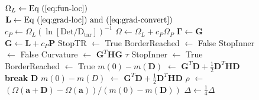 \documentclass[aps,prl,reprint,amsmath,amssymb]{revtex4-1}
\begin{document}
\begin{figure}
\begin{algorithm}[H]
\begin{algorithmic}[1]
			\State $\Omega_{L} \gets \text{Eq~(\ref{eq:fun-loc})}$ 
			\State $\mathbf{L} \gets \text{Eq~(\ref{eq:grad-loc}) and~(\ref{eq:grad-convert})}$ 
				\State $c_{P} \gets \Omega_{L}(\ln [\text{Det} / \text{D}_{\text{tar}} ])^{-1}$ 
			\EndIf
			\State $\Omega \gets \Omega_{L} + c_P \Omega_{P} $ 
				\State $\mathbf{\Gamma} \gets \mathbf{G}$ 
			\EndIf 
			\State $\mathbf{G} \gets \mathbf{L} + c_P \mathbf{P} $ 
				\State StopTR $\gets$ True
			\EndIf
                 \State BorderReached $\gets$ False 
                 \State StopInner $\gets$ False 
                 \Repeat {}
                    \State Curvature $\gets$  $\mathbf{G}^{T}\mathbf{H}\mathbf{G}$
                       \State $\tau$ 
                       \State StopInner $\gets$ True
                       \State BorderReached $\gets$ True
                       \State  $m(0)-m(\mathbf{D})$ $\gets$  $\mathbf{G}^{T}\mathbf{D}+\frac{1}{2}\mathbf{D}^{T}\mathbf{H}\mathbf{D}$
                       \State \textbf{break}
                    \Else
                       \State $\mathbf{D}$ 
                       \State  $m(0)-m(D)$ $\gets$  $\mathbf{G}^{T}\mathbf{D}+\frac{1}{2}\mathbf{D}^{T}\mathbf{H}\mathbf{D}$
                    \EndIf
                 \State $\rho$ $\gets$ $(\Omega(\mathbf{a}+\mathbf{D})-\Omega(\mathbf{a})) / (m(0)-m(\mathbf{D}))$
                    \State $\Delta \gets \frac{1}{4}\Delta$
                 \Else
   \end{algorithmic}
\end{algorithm}
\end{figure}
\end{document}
